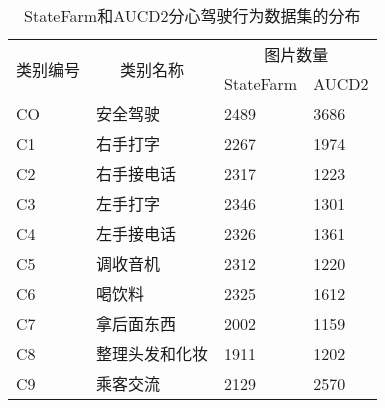 \begin{table}[!ht]
	\caption{StateFarm和AUCD2分心驾驶行为数据集的分布}
	\label{表3.1}
	\renewcommand{\arraystretch}{1.5}
	\centering
	\begin{tabular}{p{2.5cm}<{\centering}p{3.5cm}<{\centering}p{2.5cm}<{\centering}p{2.5cm}<{\centering}}
		\bottomrule
		\multicolumn{1}{c}{\multirow{2}{*}{类别编号}} &  \multicolumn{1}{c}{\multirow{2}{*}{类别名称}} & \multicolumn{2}{c}{图片数量}                                  \\ \cline{3-4} 
		\multicolumn{1}{c}{}                      & \multicolumn{1}{c}{}                      & \multicolumn{1}{c}{StateFarm} & \multicolumn{1}{c}{AUCD2} \\ \hline
		CO                                        & 安全驾驶                                      & 2489                          & 3686                      \\
		C1                                        & 右手打字                                      & 2267                          & 1974                      \\
		C2                                        & 右手接电话                                     & 2317                          & 1223                      \\
		C3                                        & 左手打字                                      & 2346                          & 1301                      \\
		C4                                        & 左手接电话                                     & 2326                          & 1361                      \\
		C5                                        & 调收音机                                      & 2312                          & 1220                      \\
		C6                                        & 喝饮料                                       & 2325                          & 1612                      \\
		C7                                        & 拿后面东西                                     & 2002                          & 1159                      \\
		C8                                        & 整理头发和化妆                                   & 1911                          & 1202                      \\
		C9                                        & 乘客交流                                      & 2129                          & 2570                      \\
		\bottomrule
	\end{tabular}
\end{table}

